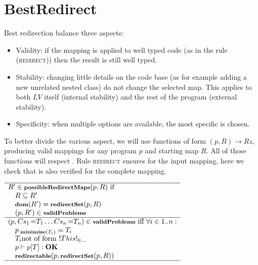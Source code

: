 


\section{BestRedirect}
Best redirection balance three aspects:
\begin{itemize}
\item Validity: if the mapping is applied to well typed code (as in the rule \textsc{(redirect)}) then the result is still well typed.
\item Stability: changing little details on the code base (as for example adding a new unrelated nested class) do not change the selected map.
This applies to both $LV$ itself (internal stability)
and the rest of the program (external stability).
\item Specificity: when multiple options are available, the most specific is chosen.
\end{itemize}

To better divide the various aspect, we will use
functions of form $(p,R)\rightarrow Rz$, producing valid mappings
for any program $p$ and starting map $R$.
All of those functions will respect 
.
Rule \textsc{redirect} ensures 
 for the input mapping,
here we check that is also verified for the complete mapping.

\noindent$\begin{array}{l}
\hline
R' \in \fop{possibleRedirectMaps}{p, R} \text{ if }\\\quad
R \subseteq R'\\\quad
\dom{R'} = \fop{redirectSet}{p, R}\\\quad
(p, R') \in \opName{validProblems}\\
\hline
(p, Cs_1\eq{T_1}\ldots Cs_n\eq{T_n}) \in \opName{validProblems} \text{ iff }
\forall i \in 1..n:\\\quad
    p\op{minimize}{T_i}=T_i\\\quad
    T_i \text{not of form } \This0{\_}\\\quad
    p \vdash p[T] : \textbf{OK}\\\quad %
    \fop{redirectable}{p, \fop{redirectSet}{p, R}}
\\\hline
\end{array}$

